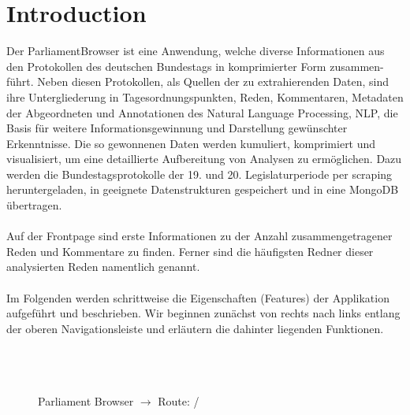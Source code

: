 \documentclass[10pt]{report}
\begin{document}
\tableofcontents

\pagebreak
\section{Introduction}
        
 Der ParliamentBrowser ist eine Anwendung, welche diverse Informationen aus den Protokollen des deutschen Bundestags in komprimierter Form zusammen-führt. Neben diesen Protokollen, als Quellen der zu extrahierenden Daten, sind ihre Untergliederung in Tagesordnungspunkten, Reden, Kommentaren, Metadaten der Abgeordneten und Annotationen des Natural Language Processing, NLP, die Basis für weitere Informationsgewinnung und Darstellung gewünschter Erkenntnisse. Die so gewonnenen Daten werden kumuliert, komprimiert und visualisiert, um eine detaillierte Aufbereitung von Analysen zu ermöglichen. Dazu werden die Bundestagsprotokolle der 19. und 20. Legislaturperiode per scraping heruntergeladen, in geeignete Datenstrukturen gespeichert und in eine MongoDB übertragen. \\\\
 Auf der Frontpage sind erste Informationen zu der Anzahl zusammengetragener Reden und Kommentare zu finden. Ferner sind die häufigsten Redner dieser analysierten Reden namentlich genannt.  \\\\
 Im Folgenden werden schrittweise die Eigenschaften (Features) der Applikation aufgeführt und beschrieben. Wir beginnen zunächst von rechts nach links entlang der oberen Navigationsleiste und erläutern die dahinter liegenden Funktionen.      
 \\\\\\\\    
\begin{figure}[H]
	\begin{center}		
  	 \end{center}
	\caption{Parliament Browser $\rightarrow$  Route:  /}	
 \end{figure} 
\end{document}
